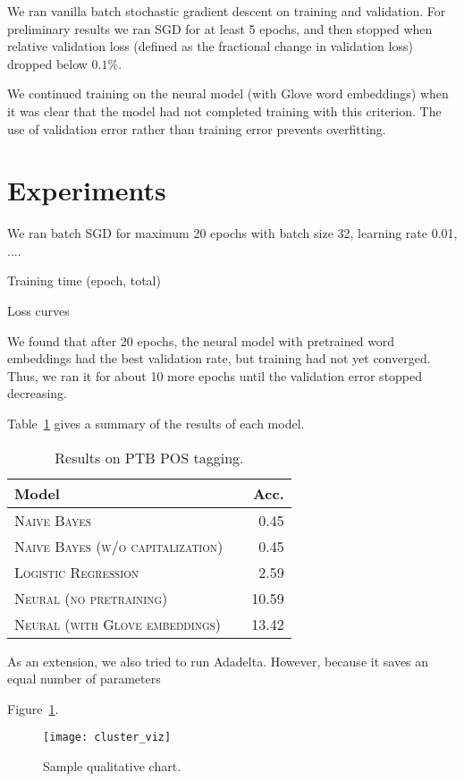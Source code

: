\documentclass[11pt]{article}
\begin{document}
We ran vanilla batch stochastic gradient descent on training and validation. For preliminary results we ran SGD for at least 5 epochs, and then stopped when relative validation loss (defined as the fractional change in validation loss) dropped below $0.1\%$.

We continued training on the neural model (with Glove word embeddings) when it was clear that the model had not completed training with this criterion. The use of validation error rather than training error prevents overfitting.

\section{Experiments}

We ran batch SGD for maximum 20 epochs with batch size 32, learning rate 0.01, ....

Training time (epoch, total)

Loss curves

We found that after 20 epochs, the neural model with pretrained word embeddings had the best validation rate, but training had not yet converged. Thus, we ran it for about 10 more epochs until the validation error stopped decreasing.


Table~\ref{tab:results} gives a summary of the results of each model.

\begin{table}[h]
\centering
\begin{tabular}{llr}
 \toprule
 Model &  & Acc. \\
 \midrule
 \textsc{Naive Bayes} & & 0.45\\
 \textsc{Naive Bayes (w/o capitalization)} & & 0.45\\
 \textsc{Logistic Regression} & & 2.59 \\
 \textsc{Neural (no pretraining)} & & 10.59  \\
 \textsc{Neural (with Glove embeddings)} & &13.42 \\
 \bottomrule
\end{tabular}
\caption{\label{tab:results} Results on PTB POS tagging.}
\end{table}

As an extension, we also tried to run Adadelta. However, because it saves an equal number of parameters


Figure~\ref{fig:clusters}.
\begin{figure}
  \centering
  \texttt{[image: cluster\_viz]}
  \caption{\label{fig:clusters} Sample qualitative chart.}
\end{figure}
\end{document}

